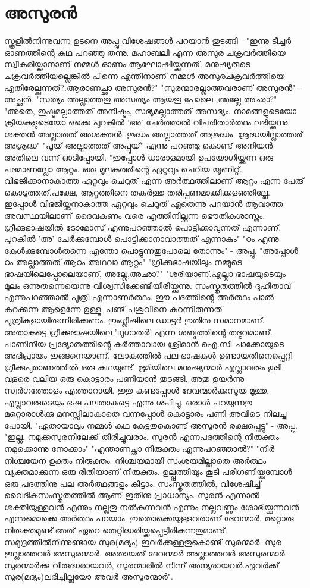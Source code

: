 \chapter{അസുരൻ}
\obeylines
സ്കൂളിൽനിന്നുവന്ന ഉടനെ അപ്പു വിശേഷങ്ങൾ പറയാൻ തുടങ്ങി - "ഇന്നു ടീച്ചർ ഓണത്തിന്റെ കഥ പറഞ്ഞു തന്നു. മഹാബലി എന്ന അസുര ചക്രവർത്തിയെ സ്വീകരിയ്ക്കാനാണ്‌ നമ്മൾ ഓണം ആഘോഷിയ്ക്കുന്നത്. മനുഷ്യരുടെ ചക്രവർത്തിയല്ലെങ്കിൽ പിന്നെ എന്തിനാണ്‌ നമ്മൾ അസുരചക്രവർത്തിയെ എതിരേല്ക്കുന്നത്?.ആരാണച്ഛാ അസുരൻ?"
"സുരന്മാരല്ലാത്തവരാണ്‌ അസുരൻ" - അച്ഛൻ.
"സത്യം അല്ലാത്തതു അസത്യം ആയതു പോലെ ,അല്ലേ അഛാ?"
"അതെ, ഇഷ്ടമല്ലാത്തത് അനിഷ്ടം, സഭ്യമല്ലാത്തത് അസഭ്യം. നാമങ്ങളുടെയോ ക്രിയകളുടെയോ ഒക്കെ പുറകിൽ 'അ' ചേർത്താൽ വിപരീതാർത്ഥം ലഭിയ്ക്കുന്നു. ശക്തൻ അല്ലാതത് അശക്തൻ. ശുദ്ധം അല്ലാത്തത് അശുദ്ധം. ശ്രദ്ധയില്ലാത്തത് അശ്രദ്ധ"
"പൂയ് അല്ലാത്തത് അപ്പൂയ്" എന്നു പറഞ്ഞു കൊണ്ട് അനിയൻ അതിലെ വന്ന് ഓടിപ്പോയി.
"ഇപ്പോൾ ധാരാളമായി ഉപയോഗിയ്ക്കുന്ന ഒരു പദമാണല്ലോ ആറ്റം. ഒരു മൂലകത്തിന്റെ ഏറ്റവും ചെറിയ യൂണിറ്റ്. വിഭജിക്കാനാകാത്ത ഏറ്റവും ചെറുത് എന്ന അർത്ഥത്തിലാണ്‌ ആറ്റം എന്ന പേരു് കൊടുത്തത്.പക്ഷേ, ആറ്റത്തിനെ തകർത്തു തരിപ്പണമാക്കിക്കളഞ്ഞില്ലേ. ഇപ്പോൾ വിഭജിയ്ക്കനാകാത്ത ഏറ്റവും ചെറുത് ഏതെന്നു പറയാൻ ആവാത്ത അവസ്ഥയിലാണ്‌ ദൈവകണം വരെ എത്തിനില്ക്കുന്ന ഭൌതികശാസ്ത്രം. ഗ്രീക്കുഭാഷയിൽ ടോമോസ് എന്നുപറഞ്ഞാൽ പൊട്ടിക്കാവുന്നത് എന്നാണ്‌. പുറകിൽ 'അ' ചേർക്കുമ്പോൾ പൊട്ടിക്കാനാവാത്തത് എന്നാകും"
"ഠം എന്നു കേൾക്കുമ്പോൾതന്നെ എന്തോ പൊട്ടുന്നതുപോലെ തോന്നും" - അപ്പു.
"അപ്പോൾ ഠം അല്ലാത്തത് ആഠം അഥവാ ആറ്റം"
"ഗ്രീക്കുഭാഷയിലും നമ്മുടെ ഭാഷയിലെപ്പോലെയാണ്‌, അല്ലേ,അഛാ?"
"ശരിയാണ്‌.എല്ലാ ഭാഷയുടെയും മൂലം ഒന്നുതന്നെയെന്നു വിശ്വസിക്കേണ്ടിയിരിയ്ക്കുന്നു. സംസ്കൃതത്തിൽ ദുഹിതാവ് എന്നുപറഞ്ഞാൽ പുത്രി എന്നാണർത്ഥം. ഈ പദത്തിന്റെ അർത്ഥം പാൽ കറക്കുന്ന ആളെന്നേ ഉള്ളൂ. പണ്ട് പശുവിനെ കറന്നിരുന്നത് പുത്രികളായിരുന്നിരിക്കണം. ഇംഗ്ലീഷിലെ ഡാട്ടർ ഇതിനു സമാനമാണ്‌. അതാകട്ടെ ഗ്രീക്കുഭാഷയിലെ 'ഥുഗാതർ' എന്ന ശബ്ദത്തിന്റെ തദ്ഭവമാണ്‌. പാണിനീയ പ്രദ്യോതത്തിന്റെ കർത്താവായ ശ്രീമാൻ ഐ.സി ചാക്കോയുടെ അഭിപ്രായം ഇങ്ങനെയാണ്‌.
ലോകത്തിൽ പല ഭാഷകൾ ഉണ്ടായതിനെപ്പെറ്റി ഗ്രീക്കുപുരാണത്തിൽ ഒരു കഥയുണ്ട്. ഭൂമിയിലെ മനുഷ്യന്മാർ എല്ലാവരും കൂടി വളരെ വലിയ ഒരു കൊട്ടാരം പണിയാൻ തുടങ്ങി. അതു ഉയർന്നു സ്വർഗത്തോളം എത്താറായി. ഇതു കണ്ടപ്പോൾ ദേവന്മാർക്കസൂയ മൂത്തു. എല്ലാവരുടെയും ഭഷ പലതാകട്ടെ എന്നു ശപിച്ചു. ഒരാൾ പറയുന്നതു മറ്റൊരാൾക്കു മനസ്സിലാകാതെ വന്നപ്പോൾ കൊട്ടാരം പണി അവിടെ നിലച്ചു പോയി.
"ഏതായാലും നമ്മൾ കഥ കേട്ടതുകൊണ്ട് അസുരൻ രക്ഷപ്പെട്ടു" - അപ്പു.
"ഇല്ല, നമുക്കസുരനിലേക്ക് തിരിച്ചുവരാം. സുരൻ എന്നപദത്തിന്റെ നിരുക്തം നമുക്കൊന്നു നോക്കാം"
"എന്താണച്ഛാ നിരുക്തം എന്നുപറഞ്ഞാൽ?"
"നിർ നിശ്ചയേന ഉക്തം നിരുക്തം. നിശ്ചയമായി സംശയമില്ലാതെ അർത്ഥം വ്യക്തമാക്കുന്ന ഒരു രീതിയാണ്‌ നിരുക്തം. ഉല്പ്പത്തിയും കൂടി പരിഗണിയ്ക്കുമ്പോൾ ഒരു പദത്തിനു പല അർത്ഥങ്ങളും കിട്ടാം. സംസ്കൃതത്തിൽ, വിശേഷിച്ച് വൈദികസംസ്കൃതത്തിൽ ആണ്‌ ഇതിനു പ്രാധാന്യം. സുരൻ എന്നാൽ ശക്തിയുള്ളവൻ എന്നും നല്ലതു നൽകുന്നവൻ എന്നും നല്ലവണ്ണം ശോഭിയ്ക്കുന്നവൻ എന്നുമൊക്കെ അർത്ഥം പറയാം. ഇതൊക്കെയുള്ളവരാണ്‌ ദേവന്മാർ. മറ്റൊരു നിരുക്തമുണ്ട്.അത് ഏറെ തെറ്റിദ്ധരിയ്ക്കപ്പെട്ടിരികുന്നതുമാണു്. സമുദ്രത്തിൽനിന്നുണ്ടായ സുര(മദ്യം) ഇവർക്കുള്ളതുകൊണ്ട് സുരന്മാർ. സുര ഇല്ലാത്തവർ അസുരന്മാർ. അതായത് ദേവന്മാർ അല്ലാത്തവർ അസുരന്മാർ. സുരന്മാർക്കു വിരുദ്ധരായവർ, സുരന്മാരിൽ നിന്ന് അന്യരായവർ.ഏവർക്ക് സുര(മദ്യം)ലഭിച്ചില്ലയോ അവർ അസുരന്മാർ".
